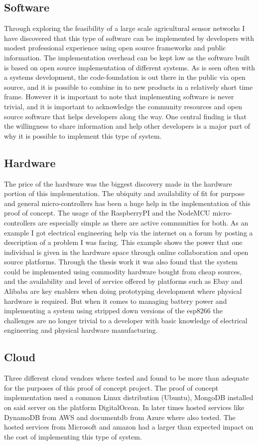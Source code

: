\documentclass[]{uiophd}
\begin{document}
\subsection{Software}
Through exploring the feasibility of a large scale agricultural sensor networks I have discovered that this type of software can be implemented by developers with modest professional experience using open source frameworks and public information. The implementation overhead can be kept low as the software built is based on open source implementation of different systems. As is seen often with a systems development, the code-foundation is out there in the public via open source, and it is possible to combine in to new products in a relatively short time frame. However it is important to note that implementing software is never trivial, and it is important to acknowledge the community resources and open source software that helps developers along the way. One central finding is that the willingness to share information and help other developers is a major part of why it is possible to implement this type of system.

\subsection{Hardware}
The price of the hardware was the biggest discovery made in the hardware portion of this implementation. The ubiquity and availability of fit for purpose and general micro-controllers has been a huge help in the implementation of this proof of concept. The usage of the RaspberryPI and the NodeMCU micro-controllers are especially simple as there are active communities for both. As an example I got electrical engineering help via the internet on a forum by posting a description of a problem I was facing. This example shows the power that one individual is given in the hardware space through online collaboration and open source platforms. Through the thesis work it was also found that the system could be implemented using commodity hardware bought from cheap sources, and the availability and level of service offered by platforms such as Ebay and Alibaba are key enablers when doing prototyping development where physical hardware is required. But when it comes to managing battery power and implementing a system using stripped down versions of the esp8266 \cite{espressif} the challenges are no longer trivial to a developer with basic knowledge of electrical engineering and physical hardware manufacturing.

\subsection{Cloud}
Three different cloud vendors where tested and found to be more than adequate for the purposes of this proof of concept project. The proof of concept implementation used a common Linux distribution (Ubuntu), MongoDB installed on said server on the platform DigitalOcean. In later times hosted services like DynamoDB from AWS and documentdb from Azure where also tested. The hosted services from Microsoft and amazon had a larger than expected impact on the cost of implementing this type of system.
\end{document}
